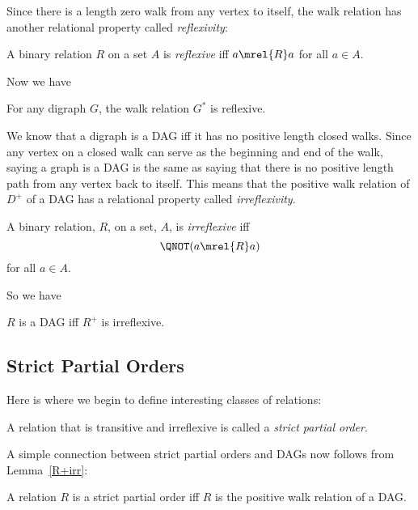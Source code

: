 Since there is a length zero walk from any vertex to itself, the walk
relation has another relational property called \emph{reflexivity}:

\begin{definition}
A binary relation $R$ on a set $A$ is \emph{reflexive}%
iff $a \mrel{R} a$ for all $a \in A$.
\end{definition}
Now we have
\begin{lemma}
For any digraph $G$, the walk relation $G^*$ is reflexive.
\end{lemma}

We know that a digraph is a DAG iff it has no positive length closed
walks.  Since any vertex on a closed walk can serve as the beginning
and end of the walk, saying a graph is a DAG is the same as saying
that there is no positive length path from any vertex back to itself.
\iffalse Lemma~\ref{shortestclosedwalk_lem} \fi This means that the
positive walk relation of $D^+$ of a DAG has a relational property
called \emph{irreflexivity}.

\begin{definition}
A binary relation, $R$, on a set, $A$, is
\emph{irreflexive} iff
\[
\QNOT(a \mrel{R} a)
\]
for all $a \in A$.
\end{definition}
So we have
\begin{lemma}\label{R+irr}
$R$ is a DAG iff $R^+$ is irreflexive.
\end{lemma}

\subsection{Strict Partial Orders}

Here is where we begin to define interesting classes of relations:

\begin{definition}%
A relation that is transitive and irreflexive is called a \emph{strict
  partial order}.
\end{definition}

A simple connection between strict partial orders and DAGs now follows
from Lemma~\ref{R+irr}:
\begin{theorem}\label{thm:SPOiffDAG}
A relation $R$ is a strict partial order iff $R$ is the positive walk
relation of a DAG.
\end{theorem}

